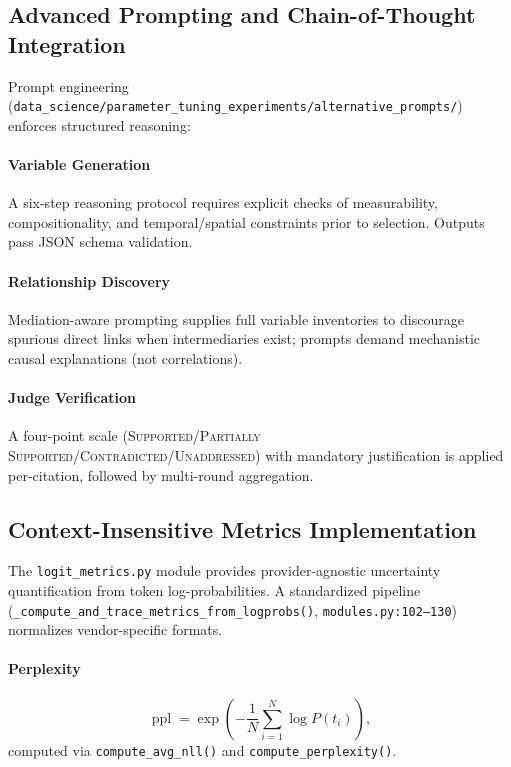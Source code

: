 \subsection{Advanced Prompting and Chain-of-Thought Integration}

Prompt engineering (\texttt{data\_science/parameter\_tuning\_experiments/alternative\_prompts/}) enforces structured reasoning:

\paragraph{Variable Generation}
A six-step reasoning protocol requires explicit checks of measurability, compositionality, and temporal/spatial constraints prior to selection. Outputs pass JSON schema validation.

\paragraph{Relationship Discovery}
Mediation-aware prompting supplies full variable inventories to discourage spurious direct links when intermediaries exist; prompts demand mechanistic causal explanations (not correlations).

\paragraph{Judge Verification}
A four-point scale (\textsc{Supported}/\textsc{Partially Supported}/\textsc{Contradicted}/\textsc{Unaddressed}) with mandatory justification is applied per-citation, followed by multi-round aggregation.

\subsection{Context-Insensitive Metrics Implementation}

The \texttt{logit\_metrics.py} module provides provider-agnostic uncertainty quantification from token log-probabilities. A standardized pipeline (\texttt{\_compute\_and\_trace\_metrics\_from\_logprobs()}, \texttt{modules.py:102--130}) normalizes vendor-specific formats.

\paragraph{Perplexity}
\[
\operatorname{ppl} = \exp\!\left(-\frac{1}{N}\sum_{i=1}^N \log P(t_i)\right),
\]
computed via \texttt{compute\_avg\_nll()} and \texttt{compute\_perplexity()}.

